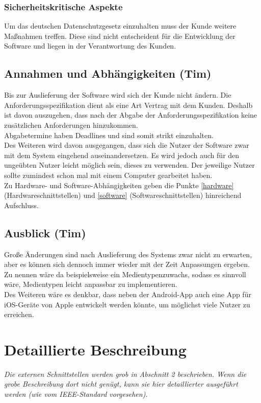 \documentclass[fontsize=12pt,paper=a4,twoside]{scrartcl}
\begin{document}
\subsubsection{Sicherheitskritische Aspekte}

Um das deutschen Datenschutzgesetz einzuhalten muss der Kunde weitere Maßnahmen treffen. Diese sind nicht entscheident für die Entwicklung der Software und liegen in der Verantwortung des Kunden.

\subsection{Annahmen und Abhängigkeiten (Tim)}

Bis zur Auslieferung der Software wird sich der Kunde nicht ändern. Die Anforderungsspezifikation dient 
als eine Art Vertrag mit dem Kunden. Deshalb ist davon auszugehen, dass nach der Abgabe der 
Anforderungsspezifikation keine zusätzlichen Anforderungen hinzukommen. \\
Abgabetermine haben Deadlines und sind somit strikt einzuhalten.\\

Des Weiteren wird davon ausgegangen, dass sich die Nutzer der Software zwar mit dem System 
eingehend auseinandersetzen. Es wird jedoch auch für den ungeübten Nutzer leicht möglich sein, dieses 
zu verwenden. Der jeweilige Nutzer sollte zumindest schon mal mit einem Computer gearbeitet haben.\\

Zu Hardware- und Software-Abhängigkeiten geben die Punkte \ref{hardware} (Hardwareschnittstellen) 
und \ref{software} (Softwareschnittstellen) hinreichend Aufschluss.
 
\subsection{Ausblick (Tim)}

Große Änderungen sind nach Auslieferung des Systems zwar nicht zu erwarten, aber es können sich dennoch immer wieder mit der Zeit Anpassungen ergeben. \\
Zu nennen wäre da beispielsweise ein Medientypenzuwachs, sodass es sinnvoll wäre, Medientypen leicht anpassbar zu implementieren. \\
Des Weiteren wäre es denkbar, dass neben der Android-App auch eine App für iOS-Geräte von Apple entwickelt werden könnte, um möglichst viele Nutzer zu erreichen.


\section{Detaillierte Beschreibung}
\label{ch:DetaillierteBeschreibung}
{\em Die externen Schnittstellen werden grob in Abschnitt 2
  beschrieben.  Wenn die grobe Beschreibung dort nicht genügt, kann
  sie hier detaillierter ausgeführt werden (wie vom IEEE-Standard
  vorgesehen).}
\end{document}
